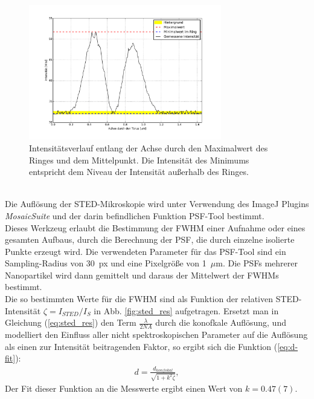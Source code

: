 \begin{figure}
	\centering
	\includegraphics[width=0.75\textwidth]{plots/doughnut.pdf}
	\caption{Intensitätsverlauf entlang der Achse durch den Maximalwert des Ringes und dem Mittelpunkt.
	Die Intensität des Minimums entspricht dem Niveau der Intensität außerhalb des Ringes.}
	\label{fig:doughnut}
\end{figure}
\\ 
Die Auflösung der STED-Mikroskopie wird unter Verwendung des ImageJ Plugins \emph{MosaicSuite} \cite{mosaic} und der darin befindlichen Funktion PSF-Tool bestimmt.\\
Dieses Werkzeug erlaubt die Bestimmung der FWHM einer Aufnahme oder eines gesamten Aufbaus, durch die Berechnung der PSF, die durch einzelne isolierte Punkte erzeugt wird.
Die verwendeten Parameter für das PSF-Tool sind ein Sampling-Radius von 30~px und eine Pixelgröße von 1~$\mu$m.
Die PSFs mehrerer Nanopartikel wird dann gemittelt und daraus der Mittelwert der FWHMs bestimmt.
\\
Die so bestimmten Werte für die FWHM sind als Funktion der relativen STED-Intensität $\zeta = I_{STED}/I_S$ in Abb. \ref{fig:sted_res} aufgetragen.
Ersetzt man in Gleichung (\ref{eq:sted_res}) den Term $\frac{\lambda}{2NA}$ durch die konofkale Auflösung, und modelliert den Einfluss aller nicht spektroskopischen Parameter auf die Auflösung als einen zur Intensität beitragenden Faktor, so ergibt sich die Funktion (\ref{eq:d-fit}):
\begin{align}
	d = \frac{d_{konfokal}}{\sqrt{1+k^2\zeta}}, \label{eq:d-fit}
\end{align}
Der Fit dieser Funktion an die Messwerte ergibt einen Wert von $k=0.47(7)$.
